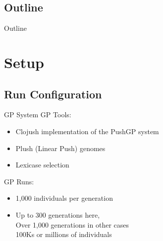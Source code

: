 \documentclass{beamer}
\begin{document}
\subsection*{Outline}

\begin{frame}{Outline}
  \tableofcontents[hideallsubsections]
\end{frame}


\section{Setup}

\subsection{Run Configuration}

\begin{frame}{GP System}
GP Tools:
\vspace{.5em}
\begin{itemize}
    \setlength\itemsep{.5em}
	\item Clojush implementation of the PushGP system
	\item Plush (Linear Push) genomes~\cite{Helmuth:2016:GPTP}
	\item Lexicase selection~\cite{Helmuth:2014:ieeeTEC}
\end{itemize}
\vspace{1em}
GP Runs:
\begin{itemize}
    \item 1,000 individuals per generation
    \item Up to 300 generations here, 
    	\\ \hspace{.5cm} Over 1,000 generations in other cases
        \\ \hspace{.5cm} 100Ks or millions of individuals
\end{itemize}
\end{frame}
\end{document}

